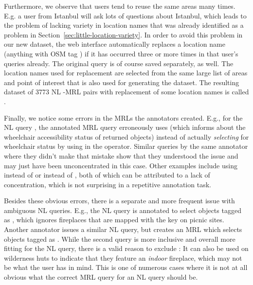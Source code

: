 Furthermore, we observe that users tend to reuse the same areas many times. E.g.
a user from Istanbul will ask lots of questions about Istanbul, which leads to
the problem of lacking variety in location names that was already identified as
a problem in Section~\ref{sec:little-location-variety}. In order to avoid this
problem in our new dataset, the web interface automatically replaces a location
name (anything with OSM tag ) if it has occurred three or more
times in that user’s queries already. The original query is of course saved
separately, as well. The location names used for replacement are selected from
the same large list of areas and point of interest that is also used for
generating the \nlmapsthree{} dataset. The resulting dataset of \num{3773} NL
-MRL pairs with replacement of some location names is called \nlmapsfourraw{}.

Finally, we notice some errors in the MRLs the annotators created. E.g., for the
NL query , the annotated MRL query erroneously uses
 (which informs about the wheelchair
accessibility status of returned objects) instead of actually \emph{selecting}
for wheelchair status by using  in the
 operator. Similar queries by the same annotator where they didn’t make
that mistake show that they understood the issue and may just have been
unconcentrated in this case. Other examples include using 
 instead of  or 
instead of , both of which can be attributed to a lack of
concentration, which is not surprising in a repetitive annotation task.

Besides these obvious errors, there is a separate and more frequent issue with
ambiguous NL queries. E.g., the NL query  is annotated to select objects tagged as
, which ignores fireplaces that are mapped with
the key  on picnic sites. Another annotator issues a
similar NL query, but creates an MRL which selects objects tagged as
  .
While the second query is more inclusive and overall more fitting for the NL
query, there is a valid reason to exclude : It can also be
used on wilderness huts to indicate that they feature an \emph{indoor}
fireplace, which may not be what the user has in mind. This is one of numerous
cases where it is not at all obvious what the correct MRL query for an NL query
should be.

